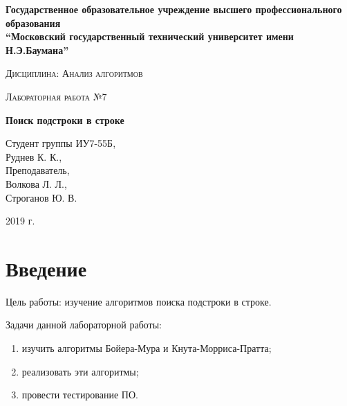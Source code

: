 \documentclass[a4paper,12pt]{report}
\begin{document}
    \begin{titlepage}

        \begin{center}
            \large
            \textbf{Государственное образовательное учреждение высшего профессионального образования\\
            “Московский государственный технический университет имени Н.Э.Баумана”\\}
			\vspace{1cm}
            
            \textsc{Дисциплина: Анализ алгоритмов}
            \vspace{0.5cm}
                
            \textsc{Лабораторная работа №7}
            \vspace{1cm}
            
            {\LARGE \textbf{Поиск подстроки в строке}}
            \vspace{3cm}
                    
            \begin{flushright}
            	Студент группы ИУ7-55Б,\\   
            	Руднев К. К.,\\
            	\vspace{0.5cm}
            	Преподаватель,\\
            	Волкова Л. Л.,\\
            	Строганов Ю. В.
            	
            \end{flushright}
            \vfill
            
            2019 г.
            
            \end{center}

    \end{titlepage}

	\setcounter{page}{2}
	\tableofcontents
    \chapter*{Введение}

        	Цель работы: изучение алгоритмов поиска подстроки в строке.
        	
        	Задачи данной лабораторной работы:
        	\begin{enumerate}
        		\item изучить алгоритмы Бойера-Мура и Кнута-Морриса-Пратта;
        		\item реализовать эти алгоритмы;
        		\item провести тестирование ПО.
        	\end{enumerate}
        \label{sec:intro}
\end{document}
